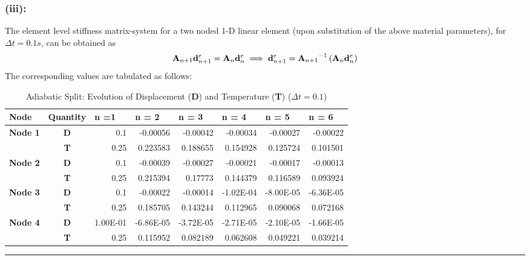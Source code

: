 \subsubsection*{(iii):}
The element level stiffness matrix-system for a two noded 1-D linear element (upon substitution of the above material parameters), for $\Delta t = 0.1s$, can be obtained as 
\begin{align*}
{\bf A}_{n+1}
{\bf d}^e_{n+1}
=
{\bf A}_{n}
{\bf d}^e_{n} \implies {\bf d}^e_{n+1} = {{\bf A}_{n+1}}^{-1}
\left( 
{\bf A}_{n}
{\bf d}^e_{n}
\right)
\end{align*} 
The corresponding values are tabulated as follows: 
\begin{table}[htbp]
  \centering
  \caption{Adiabatic Split: Evolution of Displacement ({\bf D}) and Temperature ({\bf T}) ($\Delta t = 0.1$)}
    \begin{tabular}{rcrrrrrr}
    \toprule
    \multicolumn{1}{l}{\textbf{Node }} & \multicolumn{1}{l}{\textbf{Quantity}} & \multicolumn{1}{l}{\textbf{n =1 }} & \multicolumn{1}{l}{\textbf{n = 2 }} & \multicolumn{1}{l}{\textbf{n = 3}} & \multicolumn{1}{l}{\textbf{n = 4}} & \multicolumn{1}{l}{\textbf{n = 5}} & \multicolumn{1}{l}{\textbf{n = 6}} \\
    \midrule
    \multicolumn{1}{l}{\textbf{Node 1}} & \textbf{D} & 0.1   & -0.00056 & -0.00042 & -0.00034 & -0.00027 & -0.00022 \\
          & \textbf{T} & 0.25  & 0.223583 & 0.188655 & 0.154928 & 0.125724 & 0.101501 \\
    \multicolumn{1}{l}{\textbf{Node 2}} & \textbf{D} & 0.1   & -0.00039 & -0.00027 & -0.00021 & -0.00017 & -0.00013 \\
          & \textbf{T} & 0.25  & 0.215394 & 0.17773 & 0.144379 & 0.116589 & 0.093924 \\
    \multicolumn{1}{l}{\textbf{Node 3}} & \textbf{D} & 0.1   & -0.00022 & -0.00014 & -1.02E-04 & -8.00E-05 & -6.36E-05 \\
          & \textbf{T} & 0.25  & 0.185705 & 0.143244 & 0.112965 & 0.090068 & 0.072168 \\
    \multicolumn{1}{l}{\textbf{Node 4}} & \textbf{D} & 1.00E-01 & -6.86E-05 & -3.72E-05 & -2.71E-05 & -2.10E-05 & -1.66E-05 \\
          & \textbf{T} & 0.25  & 0.115952 & 0.082189 & 0.062608 & 0.049221 & 0.039214 \\
    \bottomrule
    \end{tabular}%
  \label{tab:addlabel}%
\end{table}\hrule
